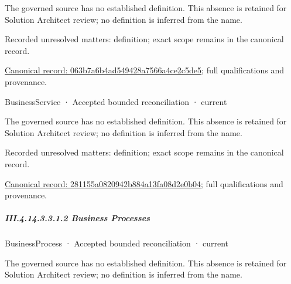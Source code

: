 The governed source has no established definition. This absence is retained for Solution Architect review; no definition is inferred from the name.


{\small Recorded unresolved matters: definition; exact scope remains in the canonical record.}\par
{\footnotesize \href{../../../../continuum/business/business-service/063b7a6b4ad549428a7566a4ce2c5de5.md}{Canonical record: 063b7a6b4ad549428a7566a4ce2c5de5}; full qualifications and provenance.}\par
{}
\label{navigation:III.4.14.3.3.1.1.2}

\label{element:281155a0820942b884a13fa08d2e0b04}
{\small BusinessService · Accepted bounded reconciliation · current}\par

The governed source has no established definition. This absence is retained for Solution Architect review; no definition is inferred from the name.


{\small Recorded unresolved matters: definition; exact scope remains in the canonical record.}\par
{\footnotesize \href{../../../../continuum/business/business-service/281155a0820942b884a13fa08d2e0b04.md}{Canonical record: 281155a0820942b884a13fa08d2e0b04}; full qualifications and provenance.}\par
\subparagraph*{III.4.14.3.3.1.2 Business Processes}
\label{navigation:III.4.14.3.3.1.2}

\label{navigation:III.4.14.3.3.1.2.1}

\label{element:6ea7f8afe17d4319ab6fa9691db4328d}
{\small BusinessProcess · Accepted bounded reconciliation · current}\par

The governed source has no established definition. This absence is retained for Solution Architect review; no definition is inferred from the name.


